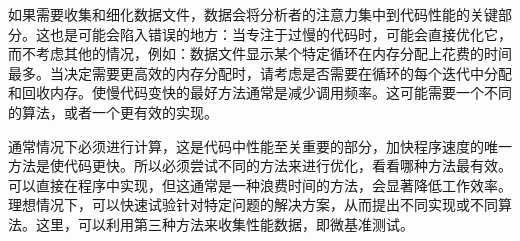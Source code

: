 如果需要收集和细化数据文件，数据会将分析者的注意力集中到代码性能的关键部分。这也是可能会陷入错误的地方：当专注于过慢的代码时，可能会直接优化它，而不考虑其他的情况，例如：数据文件显示某个特定循环在内存分配上花费的时间最多。当决定需要更高效的内存分配时，请考虑是否需要在循环的每个迭代中分配和回收内存。使慢代码变快的最好方法通常是减少调用频率。这可能需要一个不同的算法，或者一个更有效的实现。

通常情况下必须进行计算，这是代码中性能至关重要的部分，加快程序速度的唯一方法是使代码更快。所以必须尝试不同的方法来进行优化，看看哪种方法最有效。可以直接在程序中实现，但这通常是一种浪费时间的方法，会显著降低工作效率。理想情况下，可以快速试验针对特定问题的解决方案，从而提出不同实现或不同算法。这里，可以利用第三种方法来收集性能数据，即微基准测试。













